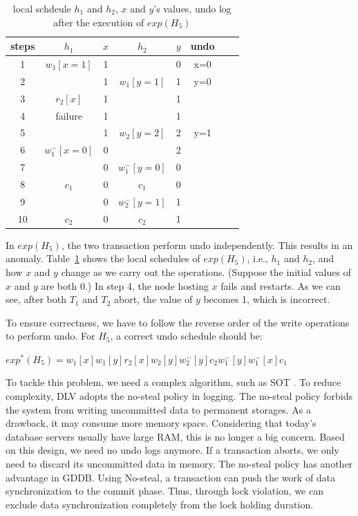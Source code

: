 \documentclass[conference]{IEEEtran}
\begin{document}
\begin{table}[tbp]
  \centering
  \caption{local schdeule $h_1$ and $h_2$, $x$ and $y$'s values, undo log after the execution of ${exp(H_5)}$}
  \begin{tabular}{|c|c|c|c|c|c|c|c|}
  \hline
steps & $h_1$ & $x$ & $h_2$ & $y$ & undo   \\
  \hline
  \hline
 1& $w_1[x=1]$ & 1 & &  0 & x=0  \\
  \hline
  2& & 1 & $w_1[y=1]$ & 1 & y=0   \\
  \hline
3 & $r_2[x]$ & 1 & & 1 &    \\

  \hline
 4 & failure  & 1 & & 1 &  \\
  \hline
 5& & 1 &   $w_2[y=2]$ & 2 & y=1  \\
  \hline
6  & $w^-_1[x=0]$ & 0 && 2 &   \\
  \hline
7 & & 0 & $w^-_1[y=0]$ & 0 &   \\
  \hline


8  & $c_1$ & 0 &$c_1$& 0 &   \\
  \hline
9 & & 0 &  $w^-_2[y=1]$& 1 &   \\
  \hline
10 & $c_2$ & 0 &$c_2$& 1 &  \\
  \hline
  \end{tabular}

\label{tbl:x_y_vlues}
\end{table}

In $exp(H_5)$, the two transaction perform undo independently. This results in an anomaly.
Table~\ref{tbl:x_y_vlues} shows the local schedules of $exp(H_5)$, i.e., ${h_1}$ and  ${h_2}$, and how ${x}$ and ${y}$ change as we carry out the operations.
(Suppose the initial values of ${x}$ and ${y}$ are both 0.)
In step 4, the node hosting ${x}$ fails and restarts.
As we can see, after both ${T_1}$ and ${T_2}$ abort, the value of ${y}$ becomes 1, which is incorrect.

To ensure correctness, we have to follow the reverse order of the write operations to perform undo.
For ${H_5}$, a correct undo schedule should be:
\begin{center}
${exp^*(H_5) = w_1[x]w_1[y]r_2[x]w_2[y]w^-_2[y]c_2w^-_1[y]w^-_1[x]c_1}$
\end{center}

To tackle this problem, we need a complex algorithm, such as SOT \cite{UnifyCR:journals/is/AlonsoVABASW94}.
To reduce complexity, DLV adopts the no-steal policy in logging.
The no-steal policy forbids the system from writing uncommitted data to permanent storages.
As a drawback, it may consume more memory space.
Considering that today's database servers usually have large RAM, this is no longer a big concern.
Based on this design, we need no undo logs anymore. If a transaction aborts, we only need to discard its uncommitted data in memory.
The no-steal policy has another advantage in GDDB.
Using No-steal, a transaction can push the work of data synchronization to the commit phase.
Thus, through lock violation, we can exclude data synchronization completely from the lock holding duration.
\end{document}
